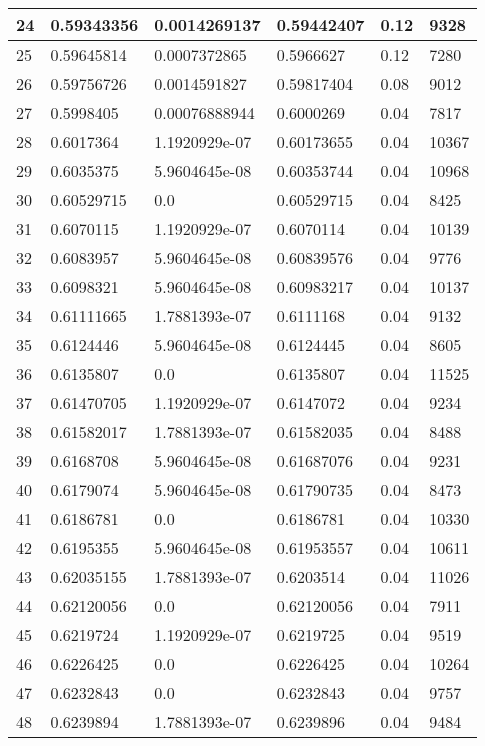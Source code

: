 \begin{longtable}{|l|l|l|l|l|l|}
24 & 0.59343356 & 0.0014269137 & 0.59442407 & 0.12 & 9328 \\ \hline 
25 & 0.59645814 & 0.0007372865 & 0.5966627 & 0.12 & 7280 \\ \hline 
26 & 0.59756726 & 0.0014591827 & 0.59817404 & 0.08 & 9012 \\ \hline 
27 & 0.5998405 & 0.00076888944 & 0.6000269 & 0.04 & 7817 \\ \hline 
28 & 0.6017364 & 1.1920929e-07 & 0.60173655 & 0.04 & 10367 \\ \hline 
29 & 0.6035375 & 5.9604645e-08 & 0.60353744 & 0.04 & 10968 \\ \hline 
30 & 0.60529715 & 0.0 & 0.60529715 & 0.04 & 8425 \\ \hline 
31 & 0.6070115 & 1.1920929e-07 & 0.6070114 & 0.04 & 10139 \\ \hline 
32 & 0.6083957 & 5.9604645e-08 & 0.60839576 & 0.04 & 9776 \\ \hline 
33 & 0.6098321 & 5.9604645e-08 & 0.60983217 & 0.04 & 10137 \\ \hline 
34 & 0.61111665 & 1.7881393e-07 & 0.6111168 & 0.04 & 9132 \\ \hline 
35 & 0.6124446 & 5.9604645e-08 & 0.6124445 & 0.04 & 8605 \\ \hline 
36 & 0.6135807 & 0.0 & 0.6135807 & 0.04 & 11525 \\ \hline 
37 & 0.61470705 & 1.1920929e-07 & 0.6147072 & 0.04 & 9234 \\ \hline 
38 & 0.61582017 & 1.7881393e-07 & 0.61582035 & 0.04 & 8488 \\ \hline 
39 & 0.6168708 & 5.9604645e-08 & 0.61687076 & 0.04 & 9231 \\ \hline 
40 & 0.6179074 & 5.9604645e-08 & 0.61790735 & 0.04 & 8473 \\ \hline 
41 & 0.6186781 & 0.0 & 0.6186781 & 0.04 & 10330 \\ \hline 
42 & 0.6195355 & 5.9604645e-08 & 0.61953557 & 0.04 & 10611 \\ \hline 
43 & 0.62035155 & 1.7881393e-07 & 0.6203514 & 0.04 & 11026 \\ \hline 
44 & 0.62120056 & 0.0 & 0.62120056 & 0.04 & 7911 \\ \hline 
45 & 0.6219724 & 1.1920929e-07 & 0.6219725 & 0.04 & 9519 \\ \hline 
46 & 0.6226425 & 0.0 & 0.6226425 & 0.04 & 10264 \\ \hline 
47 & 0.6232843 & 0.0 & 0.6232843 & 0.04 & 9757 \\ \hline 
48 & 0.6239894 & 1.7881393e-07 & 0.6239896 & 0.04 & 9484 \\ \hline 

\end{longtable}
